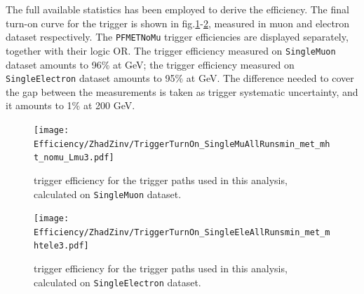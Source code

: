 \noindent The full available statistics has been employed to derive the efficiency. The final turn-on curve for the \met trigger is shown in fig.\ref{fig:MetTrigMu}-\ref{fig:MetTrigEle}, measured in muon and electron dataset respectively. The {\tt PFMETNoMu} trigger efficiencies are displayed separately, together with their logic OR. The trigger efficiency measured on {\tt SingleMuon} dataset amounts to 96\% at  GeV; the trigger efficiency measured on {\tt SingleElectron} dataset amounts to 95\% at  GeV. The difference needed to cover the gap between the measurements is taken as trigger systematic uncertainty, and it amounts to 1\% at 200 GeV.

 \begin{figure}[!htb]
   \begin{center}
     \texttt{[image: Efficiency/ZhadZinv/TriggerTurnOn\_SingleMuAllRunsmin\_met\_mht\_nomu\_Lmu3.pdf]}
   \end{center}
   \caption{\met trigger efficiency for the \met trigger paths used in this analysis, calculated on {\tt SingleMuon} dataset.}
   \label{fig:MetTrigMu}
 \end{figure}

 \begin{figure}[!htb]
   \begin{center}
     \texttt{[image: Efficiency/ZhadZinv/TriggerTurnOn\_SingleEleAllRunsmin\_met\_mhtele3.pdf]}
   \end{center}
   \caption{\met trigger efficiency for the \met trigger paths used in this analysis, calculated on {\tt SingleElectron} dataset.}
   \label{fig:MetTrigEle}
 \end{figure}

\clearpage

